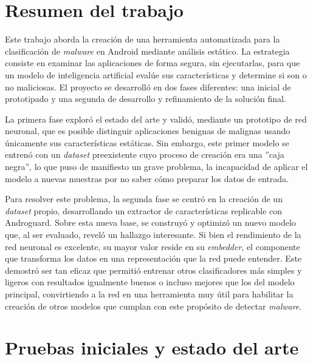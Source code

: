 
\section{Resumen del trabajo}

Este trabajo aborda la creación de una herramienta automatizada para la clasificación de \textit{malware} en Android mediante análisis estático. La estrategia consiste en examinar las aplicaciones de forma segura, sin ejecutarlas, para que un modelo de inteligencia artificial evalúe sus características y determine si son o no maliciosas. El proyecto se desarrolló en dos fases diferentes: una inicial de prototipado y una segunda de desarrollo y refinamiento de la solución final.

La primera fase exploró el estado del arte y validó, mediante un prototipo de red neuronal, que es posible distinguir aplicaciones benignas de malignas usando únicamente sus características estáticas. Sin embargo, este primer modelo se entrenó con un \textit{dataset} preexistente cuyo proceso de creación era una ''caja negra'', lo que puso de manifiesto un grave problema, la incapacidad de aplicar el modelo a nuevas muestras por no saber cómo preparar los datos de entrada.

Para resolver este problema, la segunda fase se centró en la creación de un \textit{dataset} propio, desarrollando un extractor de características replicable con Androguard. Sobre esta nueva base, se construyó y optimizó un nuevo modelo que, al ser evaluado, reveló un hallazgo interesante. Si bien el rendimiento de la red neuronal es excelente, su mayor valor reside en su \textit{embedder}, el componente que transforma los datos en una representación que la red puede entender. Este demostró ser tan eficaz que permitió entrenar otros clasificadores más simples y ligeros con resultados igualmente buenos o incluso mejores que los del modelo principal, convirtiendo a la red en una herramienta muy útil para habilitar la creación de otros modelos que cumplan con este propósito de detectar \textit{malware}.

\section{Pruebas iniciales y estado del arte}

